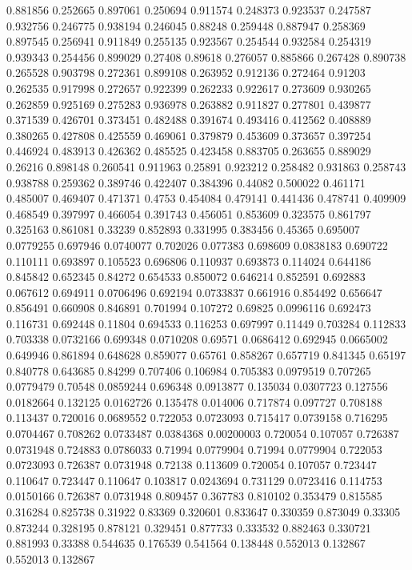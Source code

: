 0.881856 0.252665
0.897061 0.250694
0.911574 0.248373
0.923537 0.247587
0.932756 0.246775
0.938194 0.246045
0.88248 0.259448
0.887947 0.258369
0.897545 0.256941
0.911849 0.255135
0.923567 0.254544
0.932584 0.254319
0.939343 0.254456
0.899029 0.27408
0.89618 0.276057
0.885866 0.267428
0.890738 0.265528
0.903798 0.272361
0.899108 0.263952
0.912136 0.272464
0.91203 0.262535
0.917998 0.272657
0.922399 0.262233
0.922617 0.273609
0.930265 0.262859
0.925169 0.275283
0.936978 0.263882
0.911827 0.277801
0.439877 0.371539
0.426701 0.373451
0.482488 0.391674
0.493416 0.412562
0.408889 0.380265
0.427808 0.425559
0.469061 0.379879
0.453609 0.373657
0.397254 0.446924
0.483913 0.426362
0.485525 0.423458
0.883705 0.263655
0.889029 0.26216
0.898148 0.260541
0.911963 0.25891
0.923212 0.258482
0.931863 0.258743
0.938788 0.259362
0.389746 0.422407
0.384396 0.44082
0.500022 0.461171
0.485007 0.469407
0.471371 0.4753
0.454084 0.479141
0.441436 0.478741
0.409909 0.468549
0.397997 0.466054
0.391743 0.456051
0.853609 0.323575
0.861797 0.325163
0.861081 0.33239
0.852893 0.331995
0.383456 0.45365
0.695007 0.0779255
0.697946 0.0740077
0.702026 0.077383
0.698609 0.0838183
0.690722 0.110111
0.693897 0.105523
0.696806 0.110937
0.693873 0.114024
0.644186 0.845842
0.652345 0.84272
0.654533 0.850072
0.646214 0.852591
0.692883 0.067612
0.694911 0.0706496
0.692194 0.0733837
0.661916 0.854492
0.656647 0.856491
0.660908 0.846891
0.701994 0.107272
0.69825 0.0996116
0.692473 0.116731
0.692448 0.11804
0.694533 0.116253
0.697997 0.11449
0.703284 0.112833
0.703338 0.0732166
0.699348 0.0710208
0.69571 0.0686412
0.692945 0.0665002
0.649946 0.861894
0.648628 0.859077
0.65761 0.858267
0.657719 0.841345
0.65197 0.840778
0.643685 0.84299
0.707406 0.106984
0.705383 0.0979519
0.707265 0.0779479
0.70548 0.0859244
0.696348 0.0913877
0.135034 0.0307723
0.127556 0.0182664
0.132125 0.0162726
0.135478 0.014006
0.717874 0.097727
0.708188 0.113437
0.720016 0.0689552
0.722053 0.0723093
0.715417 0.0739158
0.716295 0.0704467
0.708262 0.0733487
0.0384368 0.00200003
0.720054 0.107057
0.726387 0.0731948
0.724883 0.0786033
0.71994 0.0779904
0.71994 0.0779904
0.722053 0.0723093
0.726387 0.0731948
0.72138 0.113609
0.720054 0.107057
0.723447 0.110647
0.723447 0.110647
0.103817 0.0243694
0.731129 0.0723416
0.114753 0.0150166
0.726387 0.0731948
0.809457 0.367783
0.810102 0.353479
0.815585 0.316284
0.825738 0.31922
0.83369 0.320601
0.833647 0.330359
0.873049 0.33305
0.873244 0.328195
0.878121 0.329451
0.877733 0.333532
0.882463 0.330721
0.881993 0.33388
0.544635 0.176539
0.541564 0.138448
0.552013 0.132867
0.552013 0.132867
